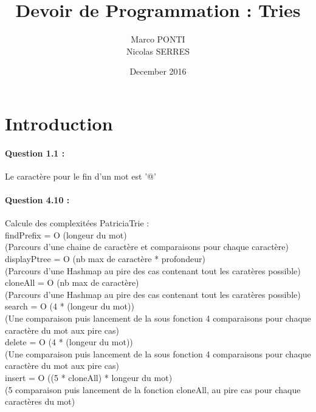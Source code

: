 \documentclass{article}
\title{Devoir de Programmation : Tries}
\author{Marco PONTI\\ Nicolas SERRES}
\date{December 2016}
\begin{document}
\maketitle

\section{Introduction}

\paragraph{Question 1.1 : }

Le caractère pour le fin d'un mot est '@'

\paragraph{Question 4.10 :}

Calcule des complexitées PatriciaTrie :\\

findPrefix = O (longeur du mot)\\
(Parcours d'une chaine de caractère et comparaisons pour chaque caractère)\\

displayPtree = O (nb max de caractère * profondeur)\\
(Parcours d'une Hashmap au pire des cas contenant tout les caratères possible)
\\

cloneAll = O (nb max de caractère)\\
(Parcours d'une Hashmap au pire des cas contenant tout les caratères possible)
\\

search = O (4 * (longeur du mot))\\
(Une comparaison puis lancement de la sous fonction 4 comparaisons pour chaque
caractère du mot aux pire cas)\\

delete = O (4 * (longeur du mot))\\
(Une comparaison puis lancement de la sous fonction 4 comparaisons pour chaque 
caractère du mot aux pire cas)\\

insert = O ((5 * cloneAll) * longeur du mot)\\
(5 comparaison puis lancement de la fonction cloneAll, au pire cas pour chaque
caractères du mot)\\
\end{document}

